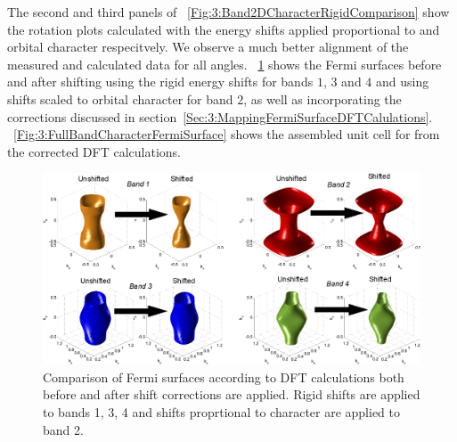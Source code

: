 The second and third panels of \fig~\ref{Fig:3:Band2DCharacterRigidComparison} show the rotation plots calculated with the energy shifts applied proportional to \DzTwo and \DxzDyz orbital character respecitvely. We observe a much better alignment of the measured and calculated data for all angles. \Fig~\ref{Fig:3:BandCharacterFSShiftComparison} shows the Fermi surfaces before and after shifting using the rigid energy shifts for bands $1$, $3$ and $4$ and using shifts scaled to \DzTwo orbital character for band $2$, as well as incorporating the corrections discussed in section~\ref{Sec:3:MappingFermiSurfaceDFTCalulations}. \Fig~\ref{Fig:3:FullBandCharacterFermiSurface} shows the assembled unit cell for \BaFeP from the corrected DFT calculations.
\begin{figure}[h!]
    \begin{center}
        \includegraphics[scale=0.7]{Chapter3-dHvABaFe2P2/Figures/AngleDepMeasurements/BandCharacterFermiSurface/BandCharacterFermiSurfaceShiftComparison}
        \caption{Comparison of Fermi surfaces according to DFT calculations both before and after shift corrections are applied. Rigid shifts are applied to bands 1, 3, 4 and shifts proprtional to \DzTwo character are applied to band 2.}
        \label{Fig:3:BandCharacterFSShiftComparison}
    \end{center}
\end{figure}
